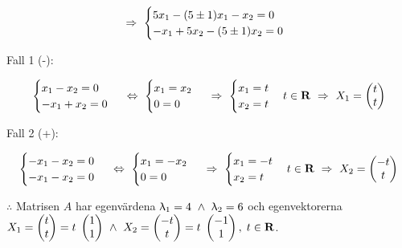 \documentclass{article}
\begin{document}
$$
\ \Rightarrow \ 
\begin{cases}
    5x_{1}-(5\pm1)x_{1}-x_{2}=0 \\
    -x_{1}+5x_{2}-(5\pm1)x_{2}=0
\end{cases}
$$

\vskip 0.2cm

Fall 1 (-):

\vskip -0.2cm

$$ 
\begin{cases}
    x_{1}-x_{2}=0 \\
    -x_{1}+x_{2}=0
\end{cases}
\ \Leftrightarrow \ 
\begin{cases}
    x_{1}=x_{2} \\
    0=0
\end{cases}
\ \Rightarrow \ 
\begin{cases}
    x_{1}=t \\
    x_{2}=t
\end{cases}
t\in\mathbf{R}
\ \Rightarrow \ 
X_{1}=
\begin{pmatrix}
    t \\
    t
\end{pmatrix}
$$

\vskip 0.2cm

Fall 2 (+):

\vskip -0.2cm

$$ 
\begin{cases}
    -x_{1}-x_{2}=0 \\
    -x_{1}-x_{2}=0
\end{cases}
\ \Leftrightarrow \ 
\begin{cases}
    x_{1}=-x_{2} \\
    0=0
\end{cases}
\ \Rightarrow \ 
\begin{cases}
    x_{1}=-t \\
    x_{2}=t
\end{cases}
t\in\mathbf{R}
\ \Rightarrow \ 
X_{2}=
\begin{pmatrix}
    -t \\
    t
\end{pmatrix}
$$

\vskip 0.3cm

$\therefore$ Matrisen $A$ har egenvärdena $\uplambda_{1}=4 \ \wedge \  \uplambda_{2}=6$ och egenvektorerna $X_{1}=\begin{pmatrix} t \\ t \end{pmatrix}=t \; \begin{pmatrix} 1 \\ 1 \end{pmatrix} \ \wedge \  X_{2}=\begin{pmatrix} -t \\ t \end{pmatrix}=t \; \begin{pmatrix} -1 \\ 1 \end{pmatrix}, \; t \in \mathbf{R}$.
\end{document}
